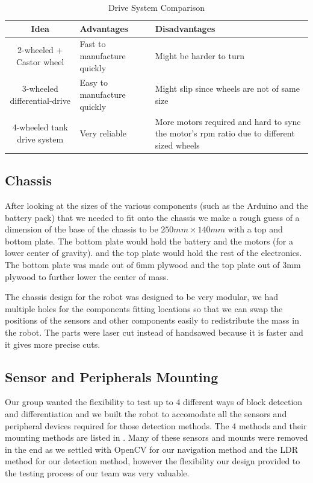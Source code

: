 \documentclass{article}
\begin{document}
\begin{table}[!h]
    \centering
    \begin{tabular}{|c|p{5cm}|p{5cm}|}
        \hline
        Idea & Advantages & Disadvantages \\
        \hline
        2-wheeled + Castor wheel & Fast to manufacture quickly& Might be harder to turn \\
        3-wheeled differential-drive & Easy to manufacture quickly & Might slip since wheels are not of same size \\
        4-wheeled tank drive system & Very reliable & More motors required and hard to sync the motor's rpm ratio due to different sized wheels \\
        \hline
    \end{tabular}
    \caption{Drive System Comparison}
    \label{tab:drive_comp}
\end{table}

\subsection{Chassis}
\quad After looking at the sizes of the various components (such as the Arduino and the battery pack) that we needed to fit onto the chassis we make a rough guess of a dimension of the base of the chassis to be $250mm \times 140mm$ with a top and bottom plate. The bottom plate would hold the battery and the motors (for a lower center of gravity). and the top plate would hold the rest of the electronics. The bottom plate was made out of 6mm plywood and the top plate out of 3mm plywood to further lower the center of mass.

The chassis design for the robot was designed to be very modular, we had multiple holes for the components fitting locations so that we can swap the positions of the sensors and other components easily to redistribute the mass in the robot. The parts were laser cut instead of handsawed because it is faster and it gives more precise cuts.

\subsection{Sensor and Peripherals Mounting}
\quad Our group wanted the flexibility to test up to 4 different ways of block detection and differentiation and we built the robot to accomodate all the sensors and peripheral devices required for those detection methods. The 4 methods and their mounting methods are listed in . Many of these sensors and mounts were removed in the end as we settled with OpenCV for our navigation method and the LDR method for our detection method, however the flexibility our design provided to the testing process of our team was very valuable.
\end{document}
